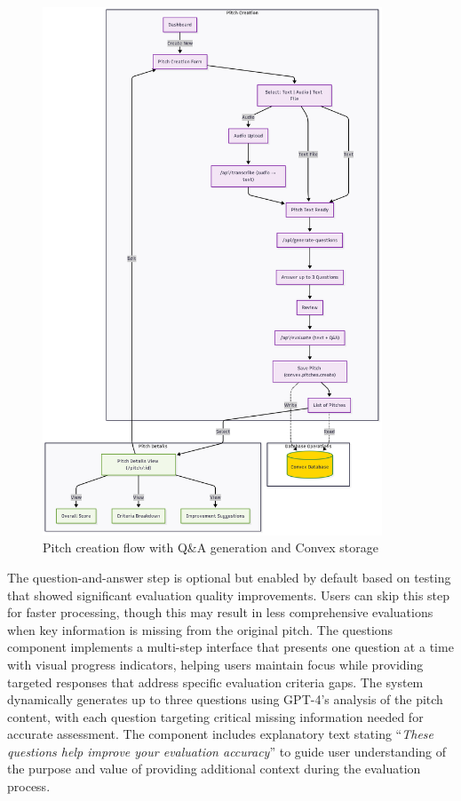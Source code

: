 \begin{figure}[H]
  \centering
  \includegraphics[width=0.9\textwidth]{img/user-flow-pitch}
\caption{Pitch creation flow with Q\&A generation and Convex storage}
  \label{fig:user-flow-pitch}
\end{figure}

The question-and-answer step is optional but enabled by default based on testing that showed significant evaluation quality improvements. Users can skip this step for faster processing, though this may result in less comprehensive evaluations when key information is missing from the original pitch. The questions component implements a multi-step interface that presents one question at a time with visual progress indicators, helping users maintain focus while providing targeted responses that address specific evaluation criteria gaps. The system dynamically generates up to three questions using GPT-4's analysis of the pitch content, with each question targeting critical missing information needed for accurate assessment. The component includes explanatory text stating ``\textit{These questions help improve your evaluation accuracy}'' to guide user understanding of the purpose and value of providing additional context during the evaluation process.


